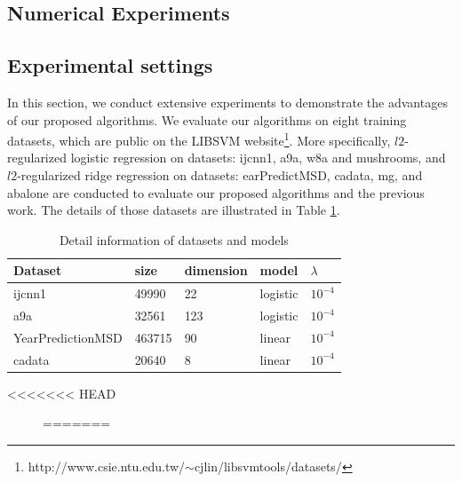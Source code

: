 \documentclass[conference]{IEEEtran}
\begin{document}
\begin{itemize}
 
 \section{Numerical Experiments}
 \label{numexperiments}
 \subsection{Experimental settings}
 In this section, we conduct extensive experiments to demonstrate the advantages of our proposed algorithms. We evaluate our algorithms on eight training datasets, which are public on the LIBSVM website\footnote{http://www.csie.ntu.edu.tw/$\sim$cjlin/libsvmtools/datasets/}. More specifically,  $l2$-regularized logistic regression on datasets: ijcnn1, a9a, w8a and mushrooms, and $l2$-regularized ridge regression on datasets: earPredictMSD, cadata, mg, and abalone  are conducted to evaluate our proposed algorithms and the previous work.  The details of those datasets are illustrated in Table \ref{data_information}.
 
 
 \begin{table}
\centering
\caption{Detail information of datasets and models}
\label{data_information}
\begin{tabular}{|l|l|l|l|l|}
\hline
Dataset           & size & dimension & model & $\lambda$ \\ \hline
ijcnn1            &  49990 &  22 &   logistic    &  $10^{-4}$         \\
a9a               &   32561&123   &     logistic  &      $10^{-4}$     \\ 
YearPredictionMSD & 463715  &  90 &    linear  &      $10^{-4}$     \\
cadata              & 20640  &8   &     linear  &    $10^{-4}$       \\ \hline
\end{tabular}
\end{table}
<<<<<<< HEAD
 
 \begin{figure}[ht]
=======



\end{figure}
\end{itemize}
\end{document}
